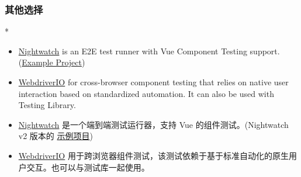 \begin{paracol}{2}
\subsubsection{其他选择}
\switchcolumn[0]*%
\begin{itemize}
\item
  \href{https://nightwatchjs.org/}{Nightwatch} is an E2E test runner
  with Vue Component Testing support.
  (\href{https://github.com/nightwatchjs-community/todo-vue}{Example
  Project})
\item
  \href{https://webdriver.io/docs/component-testing/vue}{WebdriverIO}
  for cross-browser component testing that relies on native user
  interaction based on standardized automation. It can also be used with
  Testing Library.
\end{itemize}
\switchcolumn
\begin{itemize}
\item
  \href{https://v2.nightwatchjs.org/}{Nightwatch}
  是一个端到端测试运行器，支持 Vue 的组件测试。(Nightwatch v2 版本的
  \href{https://github.com/nightwatchjs-community/todo-vue}{示例项目})
\item
  \href{https://webdriver.io/docs/component-testing/vue}{WebdriverIO}
  用于跨浏览器组件测试，该测试依赖于基于标准自动化的原生用户交互。也可以与测试库一起使用。
\end{itemize}
\end{paracol}


